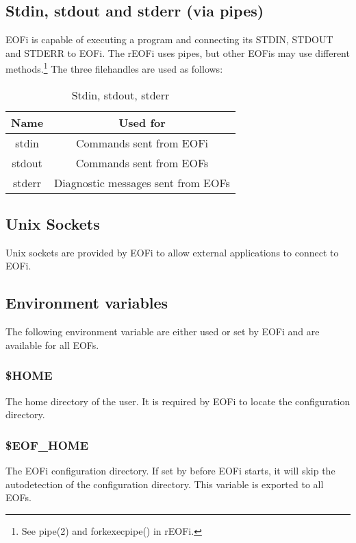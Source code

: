 \documentclass[12pt,a4paper]{book}
\begin{document}
\subsection{Stdin, stdout and stderr (via pipes)}
EOFi is capable of executing a program and connecting its STDIN, STDOUT and
STDERR to EOFi. The rEOFi uses pipes, but other EOFis may use different
methods.\footnote{See pipe(2) and forkexecpipe() in rEOFi.}
The three filehandles are used as follows:
\begin{longtable}{|c|c|}
\caption{Stdin, stdout, stderr}\\
\hline
\textbf{Name} & \textbf{Used for}\\
\hline
stdin & Commands sent from EOFi\\
\hline
stdout & Commands sent from EOFs\\
\hline
stderr & Diagnostic messages sent from EOFs\\
\hline
\end{longtable}
\subsection{Unix Sockets}
Unix sockets are provided by EOFi to allow external applications to
connect to EOFi.
\subsection{Environment variables}
The following environment variable are either used or set by EOFi and are
available for all EOFs.
\subsubsection{\$HOME}
The home directory of the user. It is required by EOFi to locate the
configuration directory.
\subsubsection{\$EOF\_HOME}
The EOFi configuration directory. If set by before EOFi starts, it will
skip the autodetection of the configuration directory.
This variable is exported to all EOFs.
\end{document}
